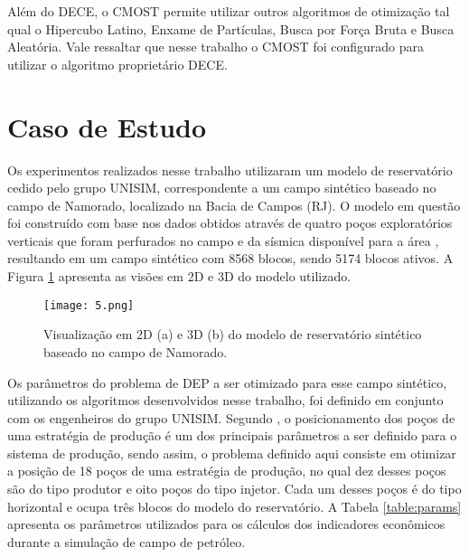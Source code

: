 Além do DECE, o CMOST permite utilizar outros algoritmos de otimização tal qual o Hipercubo Latino, Enxame de Partículas, Busca por Força Bruta e Busca Aleatória. Vale ressaltar que nesse trabalho o CMOST foi configurado para utilizar o algoritmo proprietário DECE.

\section{Caso de Estudo}
\label{sec:4_CasoEstudo}
Os experimentos realizados nesse trabalho utilizaram um modelo de reservatório cedido pelo grupo UNISIM, correspondente a um campo sintético baseado no campo de Namorado, localizado na Bacia de Campos (RJ). O modelo em questão foi construído com base nos dados obtidos através de quatro poços exploratórios verticais que foram perfurados no campo e da sísmica disponível para a área \cite{Silva2016}, resultando em um campo sintético com 8568 blocos, sendo 5174 blocos ativos. A Figura \ref{fig:4_1} apresenta as visões em 2D e 3D do modelo utilizado.

\begin{figure}[htb]

\texttt{[image: 5.png]}

\caption{Visualização em 2D (a) e 3D (b) do modelo de reservatório sintético baseado no campo de Namorado.}
\label{fig:4_1}
\end{figure}

Os parâmetros do problema de DEP a ser otimizado para esse campo sintético, utilizando os algoritmos desenvolvidos nesse trabalho, foi definido em conjunto com os engenheiros do grupo UNISIM. Segundo , o posicionamento dos poços de uma estratégia de produção é um dos principais parâmetros a ser definido para o sistema de produção, sendo assim, o problema definido aqui consiste em otimizar a posição de 18 poços de uma estratégia de produção, no qual dez desses poços são do tipo produtor e oito poços do tipo injetor. Cada um desses poços é do tipo horizontal e ocupa três blocos do modelo do reservatório. A Tabela \ref{table:params} apresenta os parâmetros utilizados para os cálculos dos indicadores econômicos durante a simulação de campo de petróleo.

